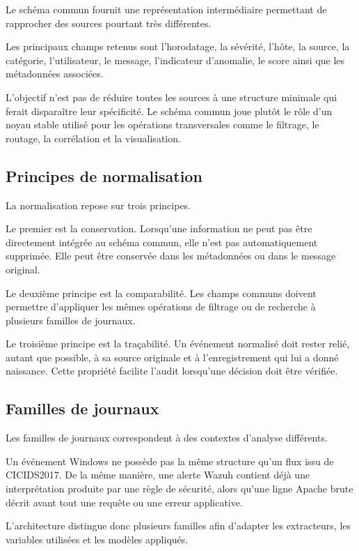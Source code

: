 Le schéma commun fournit une représentation intermédiaire permettant de rapprocher des sources pourtant très différentes.

Les principaux champs retenus sont l'horodatage, la sévérité, l'hôte, la source, la catégorie, l'utilisateur, le message, l'indicateur d'anomalie, le score ainsi que les métadonnées associées.

L'objectif n'est pas de réduire toutes les sources à une structure minimale qui ferait disparaître leur spécificité. Le schéma commun joue plutôt le rôle d'un noyau stable utilisé pour les opérations transversales comme le filtrage, le routage, la corrélation et la visualisation.

\subsection{Principes de normalisation}

La normalisation repose sur trois principes.

Le premier est la conservation. Lorsqu'une information ne peut pas être directement intégrée au schéma commun, elle n'est pas automatiquement supprimée. Elle peut être conservée dans les métadonnées ou dans le message original.

Le deuxième principe est la comparabilité. Les champs communs doivent permettre d'appliquer les mêmes opérations de filtrage ou de recherche à plusieurs familles de journaux.

Le troisième principe est la traçabilité. Un événement normalisé doit rester relié, autant que possible, à sa source originale et à l'enregistrement qui lui a donné naissance. Cette propriété facilite l'audit lorsqu'une décision doit être vérifiée.

\subsection{Familles de journaux}

Les familles de journaux correspondent à des contextes d'analyse différents.

Un événement Windows ne possède pas la même structure qu'un flux issu de CICIDS2017. De la même manière, une alerte Wazuh contient déjà une interprétation produite par une règle de sécurité, alors qu'une ligne Apache brute décrit avant tout une requête ou une erreur applicative.

L'architecture distingue donc plusieurs familles afin d'adapter les extracteurs, les variables utilisées et les modèles appliqués.

